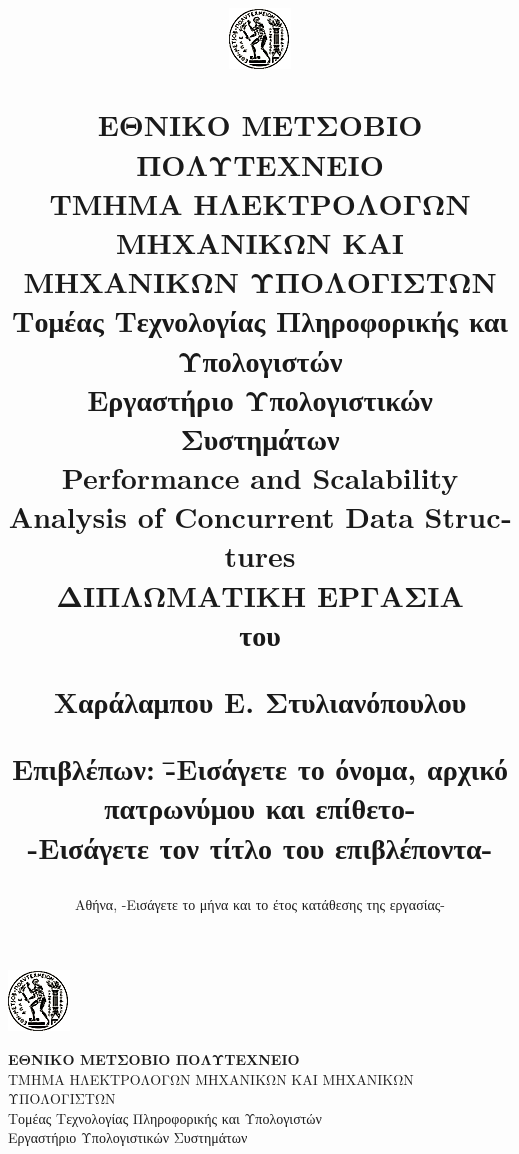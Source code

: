 \documentclass[12pt, twoside, a4paper]{report}
\begin{document}

\title{
\vspace{-6ex}
\begin{center}
\includegraphics[scale=1]{pyrforos.png}  %
\end{center}
\Large{Ε}\large{ΘΝΙΚΟ}
\Large{Μ}\large{ΕΤΣΟΒΙΟ}
\Large{Π}\large{ΟΛΥΤΕΧΝΕΙΟ} \\
\normalsize{Τ}\small{ΜΗΜΑ}
\normalsize{Η}\small{ΛΕΚΤΡΟΛΟΓΩΝ}
\normalsize{Μ}\small{ΗΧΑΝΙΚΩΝ}
\normalsize{Κ}\small{ΑΙ}
\normalsize{Μ}\small{ΗΧΑΝΙΚΩΝ}
\normalsize{Υ}\small{ΠΟΛΟΓΙΣΤΩΝ} \\
\vspace{2ex}
Τομέας Τεχνολογίας Πληροφορικής και Υπολογιστών \\
Εργαστήριο Υπολογιστικών Συστημάτων  \\
\vspace{8ex}
\large \textbf{\textlatin{Performance and Scalability Analysis of Concurrent Data Structures}} \\
\vspace{10ex}
\large
ΔΙΠΛΩΜΑΤΙΚΗ ΕΡΓΑΣΙΑ \\
\vspace{2ex}
\normalsize
του \\
\vspace{2ex}
\parbox[c]{0.4\textwidth} { \center\textbf{
Χαράλαμπου Ε. Στυλιανόπουλου }}
\vspace{10ex}
\flushleft
\begin{tabbing}
	\textbf{Επιβλέπων}: \= -Εισάγετε το όνομα, αρχικό πατρωνύμου
				και επίθετο- \\
			    \> -Εισάγετε τον τίτλο του επιβλέποντα-
\end{tabbing}
}
\date{
\normalsize
Αθήνα, -Εισάγετε το μήνα και το έτος κατάθεσης της εργασίας-}

\maketitle
\newpage
\hspace{10pt}
\includegraphics{pyrforos.png}  %
\noindent
\parbox[b]{0.6\textwidth} {
\raggedright \textbf{\normalsize{Ε}\small{ΘΝΙΚΟ} 
\normalsize{Μ}\small{ΕΤΣΟΒΙΟ}
\normalsize{Π}\small{ΟΛΥΤΕΧΝΕΙΟ}} \\
\small
ΤΜΗΜΑ ΗΛΕΚΤΡΟΛΟΓΩΝ ΜΗΧΑΝΙΚΩΝ ΚΑΙ ΜΗΧΑΝΙΚΩΝ ΥΠΟΛΟΓΙΣΤΩΝ \\
Τομέας Τεχνολογίας Πληροφορικής και Υπολογιστών \\
Εργαστήριο Υπολογιστικών Συστημάτων}
\end{document}
